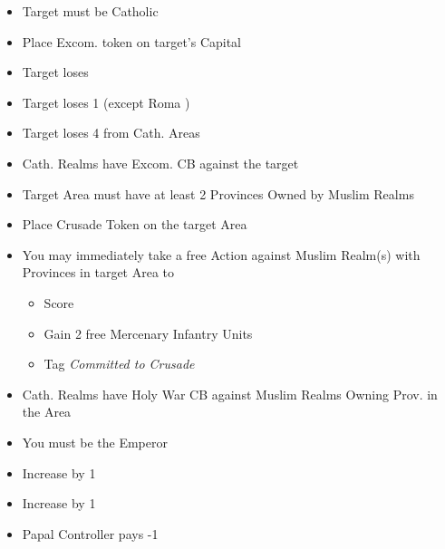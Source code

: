 \documentclass[10pt]{article}
\begin{document}
\begin{itemize}
	\item Target must be Catholic
	\item Place Excom. token on target's Capital
	\item Target loses 
	\item Target loses 1 \cardinal (except Roma \cardinal)
	\item Target loses 4 \influence from Cath. Areas
	\item Cath. Realms have Excom. CB against the target
\end{itemize}

\begin{itemize}
	\item Target Area must have at least 2 Provinces Owned by Muslim Realms
	\item Place Crusade Token on the target Area
	\item You may immediately take a free  Action against Muslim Realm(s) with Provinces in target Area to
	\begin{itemize}
		\item Score 
		\item Gain 2 free Mercenary Infantry Units
		\item Tag \emph{Committed to Crusade}
	\end{itemize}
	\item Cath. Realms have Holy War CB against Muslim Realms Owning Prov. in the Area	
\end{itemize}

\begin{itemize}
	\item You must be the Emperor
	\item Increase \authority by 1
\end{itemize}

\begin{itemize}
	\item Increase \stability by 1
	\item Papal Controller pays -1\adminpower
\end{itemize}
\end{document}
